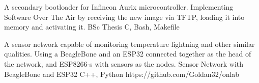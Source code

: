 \documentclass[]{awesome-cv}
\begin{document}
\vspace{-7mm}
\begin{cventries}
	\cventry
	{A secondary bootloader for Infineon Aurix microcontroller. Implementing Software Over The Air by receiving the new image via TFTP, loading it into memory and activating it.}
	{BSc Thesis}
	{C, Bash, Makefile}
	{}
	{}
	
	\vspace{-5mm}
	\cventry
	{A sensor network capable of monitoring temperature lightning and other similar qualities. Using a BeagleBone and an ESP32 connected together as the head of the network, and ESP8266-s with sensors as the nodes.}
	{Sensor Network with BeagleBone and ESP32}
	{C++, Python}
	{https://github.com/Goldan32/onlab}
	{}
	
	\vspace{-5mm}
\end{cventries}

\ 
\end{document}
